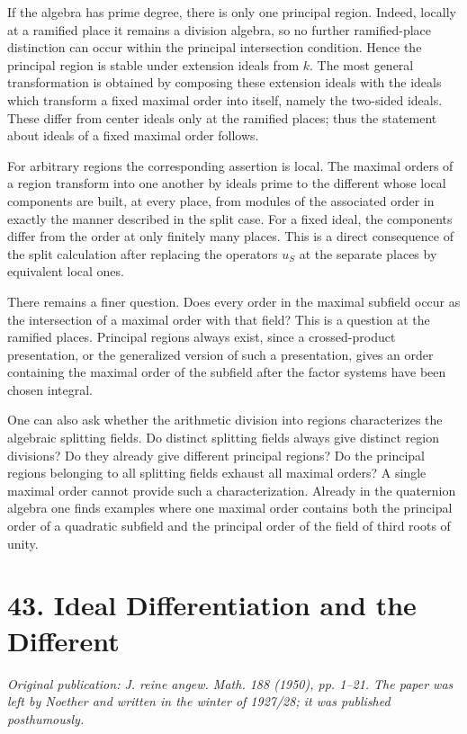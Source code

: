 \documentclass[12pt]{article}
\begin{document}
If the algebra has prime degree, there is only one principal region. Indeed, locally at a ramified place it remains a division algebra, so no further ramified-place distinction can occur within the principal intersection condition. Hence the principal region is stable under extension ideals from \(k\). The most general transformation is obtained by composing these extension ideals with the ideals which transform a fixed maximal order into itself, namely the two-sided ideals. These differ from center ideals only at the ramified places; thus the statement about ideals of a fixed maximal order follows.

For arbitrary regions the corresponding assertion is local. The maximal orders of a region transform into one another by ideals prime to the different whose local components are built, at every place, from modules of the associated order in exactly the manner described in the split case. For a fixed ideal, the components differ from the order at only finitely many places. This is a direct consequence of the split calculation after replacing the operators \(u_S\) at the separate places by equivalent local ones.

There remains a finer question. Does every order in the maximal subfield occur as the intersection of a maximal order with that field? This is a question at the ramified places. Principal regions always exist, since a crossed-product presentation, or the generalized version of such a presentation, gives an order containing the maximal order of the subfield after the factor systems have been chosen integral.

One can also ask whether the arithmetic division into regions characterizes the algebraic splitting fields. Do distinct splitting fields always give distinct region divisions? Do they already give different principal regions? Do the principal regions belonging to all splitting fields exhaust all maximal orders? A single maximal order cannot provide such a characterization. Already in the quaternion algebra one finds examples where one maximal order contains both the principal order of a quadratic subfield and the principal order of the field of third roots of unity.

\clearpage
\section{43. Ideal Differentiation and the Different}

\textit{Original publication: J. reine angew. Math. 188 (1950), pp. 1--21. The paper was left by Noether and written in the winter of 1927/28; it was published posthumously.}
\end{document}

